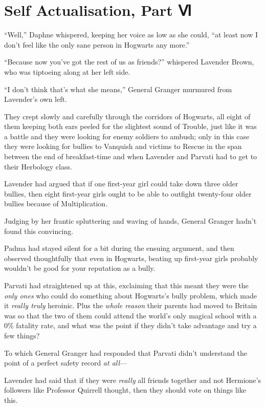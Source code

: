 \chapter{Self Actualisation, Part Ⅵ}\label{self-actualisation-part}

``Well,'' Daphne whispered, keeping her voice as low as she could, ``at
least now I don't feel like the only sane person in Hogwarts any more.''

``Because now you've got the rest of us as friends?'' whispered Lavender
Brown, who was tiptoeing along at her left side.

``I don't think that's what she means,'' General Granger murmured from
Lavender's own left.

They crept slowly and carefully through the corridors of Hogwarts, all
eight of them keeping both ears peeled for the slightest sound of
Trouble, just like it was a battle and they were looking for enemy
soldiers to ambush; only in this case they were looking for bullies to
Vanquish and victims to Rescue in the span between the end of
breakfast-time and when Lavender and Parvati had to get to their
Herbology class.

Lavender had argued that if one first-year girl could take down three
older bullies, then eight first-year girls ought to be able to outfight
twenty-four older bullies because of Multiplication.

Judging by her frantic spluttering and waving of hands, General Granger
hadn't found this convincing.

Padma had stayed silent for a bit during the ensuing argument, and then
observed thoughtfully that even in Hogwarts, beating up first-year girls
probably wouldn't be good for your reputation as a bully.

Parvati had straightened up at this, exclaiming that this meant they
were the \emph{only ones} who could do something about Hogwarts's bully
problem, which made it \emph{really truly} heroinic. Plus the
\emph{whole reason} their parents had moved to Britain was so that the
two of them could attend the world's only magical school with a 0\%
fatality rate, and what was the point if they didn't take advantage and
try a few things?

To which General Granger had responded that Parvati didn't understand
the point of a perfect safety record \emph{at all}---

Lavender had said that if they were \emph{really} all friends together
and not Hermione's followers like Professor Quirrell thought, then they
should vote on things like this.

